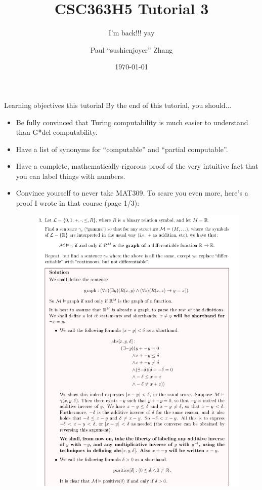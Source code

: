 \documentclass{beamer}
\title{CSC363H5 Tutorial 3}
\subtitle{I'm back!!! yay}
\date{\today}
\author{Paul ``sushi{\textunderscore}enjoyer'' Zhang}
\institute{University of Chungi}
\begin{document}
\maketitle

\begin{frame}{Learning objectives this tutorial}
By the end of this tutorial, you should...
\begin{itemize}
\item Be fully convinced that Turing computability is much easier to understand than G*del computability.
\item Have a list of synonyms for ``computable'' and ``partial computable''.
\item Have a complete, mathematically-rigorous proof of the very intuitive fact that you can label things with numbers.
\item Convince yourself to never take MAT309. To scare you even more, here's a proof I wrote in that course (page 1/3):
\begin{figure}[h]
\centering
\includegraphics[scale=0.1]{img/309.png}
\end{figure}
\end{itemize}
\end{frame}
\end{document}
